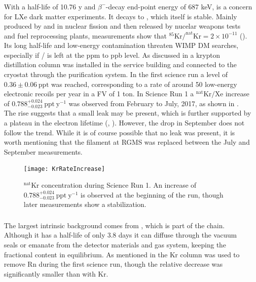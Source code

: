 {\subsubsection{}
\label{subsubsec:backgrounds_electronic_krypton}
With a half-life of 10.76 y and $\beta^-$-decay end-point energy of 687 keV,  is a concern for LXe dark matter
experiments.  It decays to , which itself is stable.  Mainly
produced by  and  in nuclear fission and then released by nucelar weapons tests and fuel reprocessing plants,
measurements show that $\mathrm{^{85}Kr / ^{nat}Kr} = 2 \times 10^{-11}$ ().  Its long half-life and low-energy
contamination threaten WIMP DM searches, especially if / is left at the ppm to ppb level.  As discussed in
 a krypton distillation column was installed in the service building and connected to the cryostat through
the purification system.  In the first science run a level of $0.36 \pm 0.06\ \mathrm{ppt}$ was reached, corresponding to a rate of
around 50 low-energy electronic recoils per year in a FV of 1 ton.  In Science Run 1 a $\mathrm{^{nat}Kr / Xe}$ increase of
$0.788_{-0.023}^{+0.024}\ \mathrm{ppt\ y^{-1}}$ was observed from February to July, 2017, as shown in
.  The rise suggests that a small leak may be present, which is further supported
by a plateau in the electron lifetime (, ).  However, the drop in September does not follow
the trend.  While it is of course possible that no leak was present, it is worth mentioning that the filament at RGMS was replaced between
the July and September measurements.

\begin{figure}
\centering
\texttt{[image: KrRateIncrease]}
\label{fig:backgrounds_electronic_krypton_rate_increase}
\caption{$\mathrm{^{nat}Kr}$ concentration during Science Run 1.  An increase of $0.788_{-0.023}^{+0.024}\ \mathrm{ppt\ y^{-1}}$ is
observed at the beginning of the run, though later measurements show a stabilization.}
\end{figure}

\subsubsection{}
\label{subsubsec:backgrounds_electronic_radon}
The largest intrinsic background comes from , which is part of the  chain.  Although it has a half-life of only
3.8 days it can diffuse through the vacuum seals or emanate from the detector materials and gas system, keeping the fractional content in
equilibrium.  As mentioned in  the Kr column was used to remove Rn during the first science run, though the
relative decrease was significantly smaller than with Kr.

}
